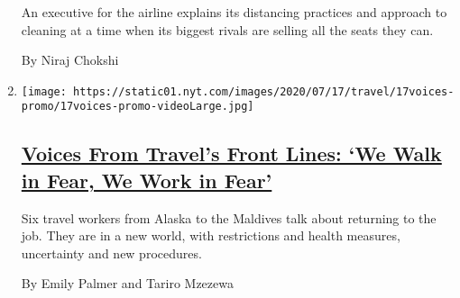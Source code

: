 \begin{enumerate}
  An executive for the airline explains its distancing practices and
  approach to cleaning at a time when its biggest rivals are selling all
  the seats they can.

  By Niraj Chokshi
\item
  \texttt{[image: https://static01.nyt.com/images/2020/07/17/travel/17voices-promo/17voices-promo-videoLarge.jpg]}

  \hypertarget{voices-from-travels-front-lines-we-walk-in-fear-we-work-in-fear}{%
  \subsection{\texorpdfstring{\href{/2020/07/17/travel/coronavirus-travel-hospitality-workers.html}{Voices
  From Travel's Front Lines: `We Walk in Fear, We Work in
  Fear'}}{Voices From Travel's Front Lines: `We Walk in Fear, We Work in Fear'}}\label{voices-from-travels-front-lines-we-walk-in-fear-we-work-in-fear}}

  Six travel workers from Alaska to the Maldives talk about returning to
  the job. They are in a new world, with restrictions and health
  measures, uncertainty and new procedures.

  By Emily Palmer and Tariro Mzezewa
\end{enumerate}

